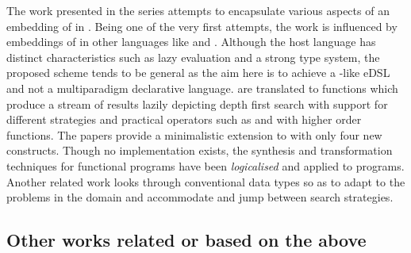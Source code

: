 \documentclass[thesis-solanki.tex]{subfiles}
\begin{document}
The work presented in the series
\cite{spivey1999embedding,seres1999algebra,seres2001higher,spivey1999algebra,seres2001algebra} attempts to
encapsulate various aspects of an embedding of  in .
Being one of the very first attempts, the work is influenced by embeddings of 
in other languages like  and .
Although the host language has distinct characteristics such as lazy evaluation and a strong type system, the proposed
scheme tends to be general as the aim here is to achieve a -like eDSL and not a multiparadigm
declarative language.
  are translated to  functions which produce a
stream of results lazily depicting depth first search with support for different strategies and practical operators
such as  and  with higher order functions.
The papers provide a minimalistic extension to  with only four new constructs.
Though no implementation exists, the synthesis and transformation techniques for functional programs have been
\textit{logicalised} and applied to  programs.
Another related work \cite{spivey2000functional} looks through conventional data types so as to adapt to the
problems in the domain and accommodate and jump between search strategies.


\subsection{Other works related or based on the above}

\end{document}
